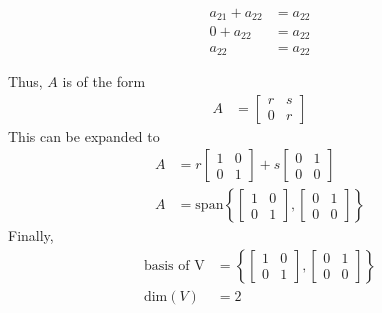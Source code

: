 \documentclass[letterpaper,12pt]{article}
\begin{document}
\begin{enumerate}
\begin{minipage}[t]{\dimexpr0.33\linewidth-.2pt}
\begin{align*}
      \end{align*}
    \end{minipage}
    \begin{minipage}[t]{\dimexpr0.33\linewidth-.2pt}
      \begin{align*}
        a_{21} + a_{22} &= a_{22} \\
        0 + a_{22} &= a_{22} \\
        a_{22} &= a_{22}
      \end{align*}
    \end{minipage}
    Thus, $A$ is of the form
    \begin{align*}
      A &= \begin{bmatrix}
        r & s \\
        0 & r
      \end{bmatrix}
    \end{align*}
    This can be expanded to
    \begin{align*}
      A &= r\begin{bmatrix}
        1 & 0 \\
        0 & 1
      \end{bmatrix} +
      s\begin{bmatrix}
        0 & 1 \\
        0 & 0
      \end{bmatrix} \\
      A &= \text{span}\left\{
        \begin{bmatrix}
          1 & 0 \\
          0 & 1
        \end{bmatrix},
        \begin{bmatrix}
          0 & 1 \\
          0 & 0
        \end{bmatrix}
      \right\}
    \end{align*}
    Finally,
    \begin{align*}
      \text{basis of V} &= \left\{
        \begin{bmatrix}
          1 & 0 \\
          0 & 1
        \end{bmatrix},
        \begin{bmatrix}
          0 & 1 \\
          0 & 0
        \end{bmatrix}
      \right\} \\
      \text{dim}(V) &= 2
    \end{align*}

\end{enumerate}
\end{document}
